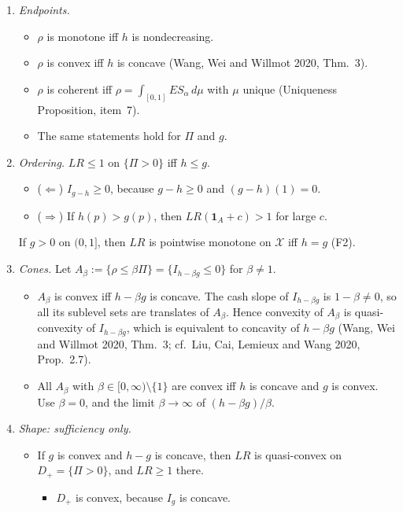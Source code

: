 \begin{corollary}
\begin{enumerate}
\item[(a)] \emph{Endpoints.}
  \begin{itemize}
  \item $\rho$ is monotone iff $h$ is nondecreasing.
  \item $\rho$ is convex iff $h$ is concave (Wang, Wei and Willmot 2020, Thm.~3).
  \item $\rho$ is coherent iff $\rho=\int_{[0,1]}ES_\alpha\,d\mu$ with $\mu$ unique (Uniqueness Proposition, item~7).
  \item The same statements hold for $\Pi$ and $g$.
  \end{itemize}
\item[(b)] \emph{Ordering.} $LR\le1$ on $\{\Pi>0\}$ iff $h\le g$.
  \begin{itemize}
  \item ($\Leftarrow$) $I_{g-h}\ge0$, because $g-h\ge0$ and $(g-h)(1)=0$.
  \item ($\Rightarrow$) If $h(p)>g(p)$, then $LR(\mathbf 1_A+c)>1$ for large $c$.
  \end{itemize}
  If $g>0$ on $(0,1]$, then $LR$ is pointwise monotone on $\mathcal X$ iff $h=g$ (F2).
\item[(c)] \emph{Cones.} Let $A_\beta:=\{\rho\le\beta\Pi\}=\{I_{h-\beta g}\le0\}$ for $\beta\ne1$.
  \begin{itemize}
  \item $A_\beta$ is convex iff $h-\beta g$ is concave. The cash slope of $I_{h-\beta g}$ is $1-\beta\ne0$, so all its sublevel sets are translates of $A_\beta$. Hence convexity of $A_\beta$ is quasi-convexity of $I_{h-\beta g}$, which is equivalent to concavity of $h-\beta g$ (Wang, Wei and Willmot 2020, Thm.~3; cf.\ Liu, Cai, Lemieux and Wang 2020, Prop.~2.7).
  \item All $A_\beta$ with $\beta\in[0,\infty)\setminus\{1\}$ are convex iff $h$ is concave and $g$ is convex. Use $\beta=0$, and the limit $\beta\to\infty$ of $(h-\beta g)/\beta$.
  \end{itemize}
\item[(d)] \emph{Shape: sufficiency only.}
  \begin{itemize}
  \item If $g$ is convex and $h-g$ is concave, then $LR$ is quasi-convex on $D_+=\{\Pi>0\}$, and $LR\ge1$ there.
    \begin{itemize}
    \item $D_+$ is convex, because $I_g$ is concave.

\end{itemize}
\end{itemize}
\end{enumerate}
\end{corollary}
